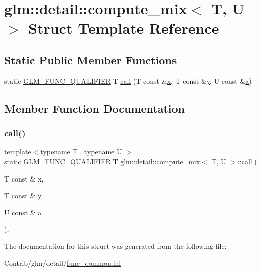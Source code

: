 \hypertarget{structglm_1_1detail_1_1compute__mix}{}\section{glm\+:\+:detail\+:\+:compute\+\_\+mix$<$ T, U $>$ Struct Template Reference}
\label{structglm_1_1detail_1_1compute__mix}
\subsection*{Static Public Member Functions}
\begin{DoxyCompactItemize}
\item 
static \mbox{\hyperlink{setup_8hpp_a33fdea6f91c5f834105f7415e2a64407}{G\+L\+M\+\_\+\+F\+U\+N\+C\+\_\+\+Q\+U\+A\+L\+I\+F\+I\+ER}} T \mbox{\hyperlink{structglm_1_1detail_1_1compute__mix_a13fd963d8385f36486509a48fd68da1c}{call}} (T const \&\mbox{\hyperlink{_s_d_l__opengl_8h_ad0e63d0edcdbd3d79554076bf309fd47}{x}}, T const \&\mbox{\hyperlink{_s_d_l__opengl_8h_a1675d9d7bb68e1657ff028643b4037e3}{y}}, U const \&\mbox{\hyperlink{_s_d_l__opengl__glext_8h_a3309789fc188587d666cda5ece79cf82}{a}})
\end{DoxyCompactItemize}


\subsection{Member Function Documentation}
\mbox{\label{structglm_1_1detail_1_1compute__mix_a13fd963d8385f36486509a48fd68da1c}} 
\subsubsection{\texorpdfstring{call()}{call()}}
{\footnotesize\ttfamily template$<$typename T , typename U $>$ \\
static \mbox{\hyperlink{setup_8hpp_a33fdea6f91c5f834105f7415e2a64407}{G\+L\+M\+\_\+\+F\+U\+N\+C\+\_\+\+Q\+U\+A\+L\+I\+F\+I\+ER}} T \mbox{\hyperlink{structglm_1_1detail_1_1compute__mix}{glm\+::detail\+::compute\+\_\+mix}}$<$ T, U $>$\+::call (\begin{DoxyParamCaption}\item[{T const \&}]{x,  }\item[{T const \&}]{y,  }\item[{U const \&}]{a }\end{DoxyParamCaption})\hspace{0.3cm}{\ttfamily [inline]}, {\ttfamily [static]}}



The documentation for this struct was generated from the following file\+:\begin{DoxyCompactItemize}
\item 
Contrib/glm/detail/\mbox{\hyperlink{func__common_8inl}{func\+\_\+common.\+inl}}\end{DoxyCompactItemize}
